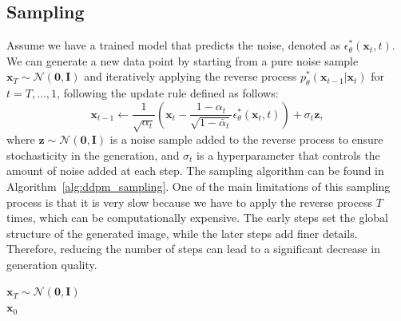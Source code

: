 \subsection{Sampling} 
Assume we have a trained model that predicts the noise, denoted as $\epsilon_{\theta}^*(\mathbf{x}_t, t)$. We can generate a new data point by starting from a pure noise sample 
$\mathbf{x}_T \sim \mathcal{N}(\mathbf{0}, \mathbf{I})$ and iteratively applying the reverse process $p_{\theta}^*(\mathbf{x}_{t-1}|\mathbf{x}_t)$ for $t = T, \dots, 1$, following the 
update rule defined as follows:
\begin{equation}
    \mathbf{x}_{t-1} \leftarrow \frac{1}{\sqrt{\alpha_t}} \left( \mathbf{x}_t - \frac{1 - \alpha_t}{\sqrt{1-\bar{\alpha}_t}} \epsilon_{\theta}^*(\mathbf{x}_t, t) \right) + \sigma_t \mathbf{z},
\end{equation}
where $\mathbf{z} \sim \mathcal{N}(\mathbf{0}, \mathbf{I})$ is a noise sample added to the reverse process to ensure stochasticity in the generation, and $\sigma_t$ is a hyperparameter 
that controls the amount of noise added at each step. The sampling algorithm can be found in Algorithm~\ref{alg:ddpm_sampling}. One of the main limitations of this sampling process is that it  
is very slow because we have to apply the reverse process $T$ times, which can be computationally expensive. The early steps set the global structure of the generated image, while the later 
steps add finer details. Therefore, reducing the number of steps can lead to a significant decrease in generation quality. 
\begin{algorithm}[ht]
\caption{Sampling in DDPMs}
\label{alg:ddpm_sampling}
$\mathbf{x}_T \sim \mathcal{N}(\mathbf{0}, \mathbf{I})$\\
\Return $\mathbf{x}_0$
\end{algorithm}







